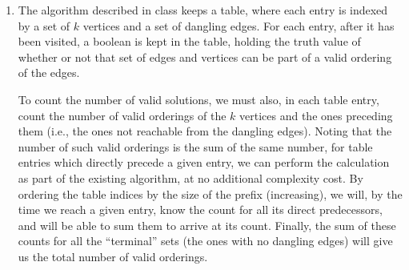 \documentclass[11pt]{article} \usepackage{amssymb}
\newtheorem{proposition}[theorem]{Proposition}
\newenvironment{proof}{\noindent \textbf{Proof:}}{$\Box$}
\begin{document}
\begin{enumerate}
    \begin{proposition}
      The function min-TOUR, as defined above, indeed returns a tour of minimum
      length that starts at $u$, ends at $v$ and visits each vertex in $W$ 
      exactly once.
    \end{proposition}
    \begin{proof}
      If $W=\{u,v\}$, then the shortest such tour is $(u,v)$, and 
      hence the stopping criterion is clearly correct. Otherwise,
      a shortest tour will go from $u$ to some $w$, and then continue along
      a shortest tour from $w$ to $v$ in $W\setminus \{u\}$. Since
      the algorithm checks all such possiblities for a sortest path,
      it will certainly find one.
    \end{proof}
    \begin{proposition}
      If the results of previous calls are stored in a table, the running
      time of the algorithm will be $O(n^32^n)$.
    \end{proposition}
    \begin{proof}
      The running time without the recursive calls is obviously
      $O(n)$. Since there are $|\mathcal{I}|\leq n^22^n$ possible inputs to 
      the algorithm,
      running time will be at most $n^32^n$ if each function call is carried
      out only once, and found in a table in subsequent times in $O(1)$.
    \end{proof}

    To now find a shortest {\bf cycle}, one can run min-TOUR on $(V,(u,v))$, 
    choosing an arbitrary $u$ and trying all possible $v$'s, 
    adding $w(v,u)$ to the length of the tour
     to find the length of the cycle, and choosing the minimum cycle.
    This would take $O(n)$ times the running time of min-TOUR, and hence
    $O(n^42^n)$.
  \item
    The algorithm described in class keeps a table, where each entry is
    indexed by a set of $k$ vertices and a set of dangling edges. For each
    entry, after it has been visited, a boolean is kept in the table,
    holding the truth value of whether or not that set of edges and 
    vertices can be part of a valid ordering of the edges.

    To count the number of valid solutions, we must also, in each table
    entry, count the number of valid orderings of the $k$ vertices and the
    ones preceding them (i.e., the ones not reachable from the dangling 
    edges). Noting that the number of such valid orderings is the sum
    of the same number, for table entries which directly precede a given entry,
    we can perform the calculation as part of the existing algorithm, at no
    additional complexity cost. By ordering the table indices by
    the size of the prefix (increasing), we will, by the time we reach
    a given entry, know the count for all its direct predecessors, and will
    be able to sum them to arrive at its count. Finally, the sum of these
    counts for all the ``terminal'' sets (the ones with no dangling edges)
    will give us the total number of valid orderings.
    
\end{enumerate}
\end{document}
